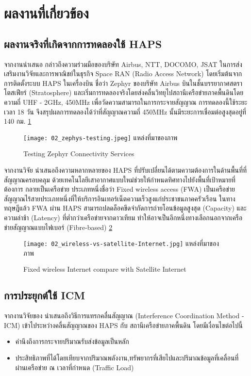 \section{ผลงานที่เกี่ยวข้อง}

\subsection{ผลงานจริงที่เกิดจากการทดลองใช้ HAPS}

จากงานนำเสนอ \cite{spacecompass}
กล่าวถึงความร่วมมือของบริษัท Airbus, NTT, DOCOMO, JSAT ในการส่งเสริมงานวิจัยและการพาณิชย์ในธุรกิจ Space RAN (Radio Access Network)
โดยเริ่มต้นจากการติดตั้งระบบ HAPS ในเครื่องบิน ชื่อว่า Zephyr ของบริษัท Airbus บินในชั้นบรรยากาศสตราโตสเฟียร์ (Stratosphere) 
และเริ่มการทดลองจริงโดยส่งคลื่นวิทยุไปสถานีเครือข่ายภาคพื้นดินโดยความถี่
UHF - 2GHz, 450MHz เพื่อวัดความสามารถในการกระจายสัญญาณ การทดลองนี้ใช้ระยะเวลา 18 วัน 
จึงสรุปผลการทดลองได้ว่าที่สัญญาณความถี่ 450MHz นั้นมีระยะการเชื่อมต่อสูงสุดอยู่ที่ 140 กม. \ref{fig:02-zephyr-testing}

\begin{figure}[h]
\centering
\texttt{[image: 02\_zephys-testing.jpeg]}
\hfill\small แหล่งที่มาของภาพ \cite{spacecompass}
\caption[Testing Zephyr]{Testing Zephyr Connectivity Services} \label{fig:02-zephyr-testing}
\end{figure}

จากงานวิจัย \cite{gsmatowers}
นำเสนอถึงความหลากหลายของ HAPS ที่ปรับเปลี่ยนได้ตามความต้องการในด้านพื้นที่ที่สัญญาณครอบคลุม ด้วยเทคโนโลยีเสาอากาศแบบใหม่ช่วยให้กำหนดทิศทางไปยังพื้นที่เป้าหมายที่ต้องการ กลายเป็นเครือข่าย
ประเภทหนึ่งชื่อว่า Fixed wireless access (FWA) เป็นเครือข่ายสัญญาณไร้สายประเภทหนึ่งที่ให้บริการอินเทอร์เน็ตความเร็วสูงแก่ประชาชนภาคครัวเรือน ในทางทฤษฎีแล้ว
FWA ผ่าน HAPS สามารถปลดล็อคขีดจำกัดการถ่ายโอนข้อมูลสูงสุด (Capacity) และความล่าช้า (Latency) ที่ต่ำกว่าเครือข่ายจากดาวเทียม
ทำให้อาจเป็นอีกหนึ่งทางเลือกนอกจากเครือข่ายสัญญาณแบบไฟเบอร์ (Fibre-based) \ref{fig:02-wireless-vs-satellite}

\begin{figure}[h]
\centering
\texttt{[image: 02\_wireless-vs-satellite-Internet.jpg]}
\hfill\small แหล่งที่มาของภาพ \cite{fwi}
\caption[wireless vs satellite]{Fixed wireless Internet compare with Satellite Internet} \label{fig:02-wireless-vs-satellite}
\end{figure}

\subsection{การประยุกต์ใช้ ICM}

จากงานวิจัยของ \cite{liu2021interference}
นำเสนอถึงวิธีการแทรกคลื่นสัญญาณ (Interference Coordination Method - ICM) เข้าไประหว่างคลื่นสัญญาณของ HAPS กับ สถานีเครือข่ายภาคพื้นดิน โดยมีเงื่อนไขต่อไปนี้
\begin{itemize}
    \item คำนึงถึงการกระจายปริมาณรับส่งข้อมูลเป็นหลัก 
    \item ประสิทธิภาพที่ได้โดยเทียบจากปริมาณพลังงาน,ทรัพยากรที่เสียไปและปริมาณข้อมูลที่เคลื่อนที่ผ่านเครือข่าย ณ เวลาที่กำหนด (Traffic Load)
\end{itemize}
